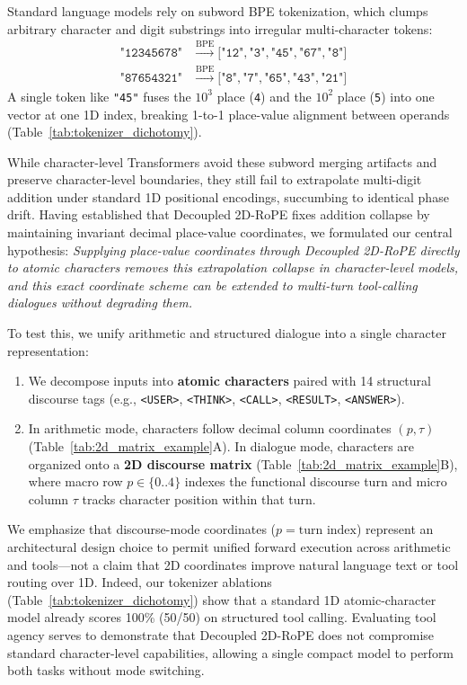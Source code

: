 \documentclass[10pt,twocolumn]{article}
\begin{document}
Standard language models rely on subword BPE tokenization, which clumps arbitrary character and digit substrings into irregular multi-character tokens:
\begin{equation*}
\begin{aligned}
\texttt{"12345678"} &\xrightarrow{\text{BPE}} \big[\texttt{"12"}, \texttt{"3"}, \texttt{"45"}, \texttt{"67"}, \texttt{"8"}\big] \\
\texttt{"87654321"} &\xrightarrow{\text{BPE}} \big[\texttt{"8"}, \texttt{"7"}, \texttt{"65"}, \texttt{"43"}, \texttt{"21"}\big]
\end{aligned}
\end{equation*}
A single token like \texttt{"45"} fuses the $10^3$ place (\texttt{4}) and the $10^2$ place (\texttt{5}) into one vector at one 1D index, breaking 1-to-1 place-value alignment between operands (Table~\ref{tab:tokenizer_dichotomy}).

While character-level Transformers avoid these subword merging artifacts and preserve character-level boundaries, they still fail to extrapolate multi-digit addition under standard 1D positional encodings, succumbing to identical phase drift. Having established that Decoupled 2D-RoPE fixes addition collapse by maintaining invariant decimal place-value coordinates, we formulated our central hypothesis: \emph{Supplying place-value coordinates through Decoupled 2D-RoPE directly to atomic characters removes this extrapolation collapse in character-level models, and this exact coordinate scheme can be extended to multi-turn tool-calling dialogues without degrading them.}

To test this, we unify arithmetic and structured dialogue into a single character representation:
\begin{enumerate}[leftmargin=*,nosep]
    \item We decompose inputs into \textbf{atomic characters} paired with 14 structural discourse tags (e.g., \texttt{<USER>}, \texttt{<THINK>}, \texttt{<CALL>}, \texttt{<RESULT>}, \texttt{<ANSWER>}).
    \item In arithmetic mode, characters follow decimal column coordinates $(p, \tau)$ (Table~\ref{tab:2d_matrix_example}A). In dialogue mode, characters are organized onto a \textbf{2D discourse matrix} (Table~\ref{tab:2d_matrix_example}B), where macro row $p \in \{0..4\}$ indexes the functional discourse turn and micro column $\tau$ tracks character position within that turn.
\end{enumerate}
We emphasize that discourse-mode coordinates ($p = \text{turn index}$) represent an architectural design choice to permit unified forward execution across arithmetic and tools---not a claim that 2D coordinates improve natural language text or tool routing over 1D. Indeed, our tokenizer ablations (Table~\ref{tab:tokenizer_dichotomy}) show that a standard 1D atomic-character model already scores 100\% (50/50) on structured tool calling. Evaluating tool agency serves to demonstrate that Decoupled 2D-RoPE does not compromise standard character-level capabilities, allowing a single compact model to perform both tasks without mode switching.
\end{document}
